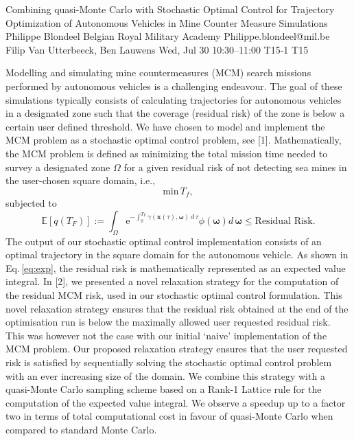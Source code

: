 \begin{talk}
  {Combining quasi-Monte Carlo with Stochastic Optimal Control for Trajectory Optimization of Autonomous Vehicles in Mine Counter Measure Simulations}%
  {Philippe Blondeel}%
  {Belgian Royal Military Academy}%
  {Philippe.blondeel@mil.be}%
  {Filip Van Utterbeeck, Ben Lauwens}%
  {}%
  {Wed, Jul 30 10:30–11:00}%
  {T15-1}%
  {T15}%
  
				
			
Modelling and simulating mine countermeasures (MCM) search missions performed by autonomous vehicles is a challenging endeavour. The goal of these simulations typically consists of calculating trajectories for autonomous vehicles in a designated zone such that the coverage (residual risk) of the zone is below a certain user defined threshold. We have chosen to model and implement the MCM problem as a stochastic optimal control problem, see [1]. Mathematically, the MCM problem is defined as minimizing the total mission time needed to survey a designated zone $\Omega$ for a given residual risk of not detecting sea mines in the  user-chosen square  domain, i.e., 
\begin{equation}
\text{min}\, T_f,
\label{eq:min}
\end{equation}
subjected to
\begin{equation}
 \mathbb{E}[q\left(T_F\right)] :=  \int_\Omega \text{e}^{-\int_0^{T_F} \gamma\left(\bm{x}\left(\tau\right),\bm{\omega}\right)\, d\,\tau}\phi\left(\bm{\omega}\right) d\,\bm{\omega} \leq \text{Residual Risk}.
\label{eq:exp}
\end{equation}
The output of our stochastic optimal control implementation consists of an optimal trajectory in the square domain for the autonomous vehicle.  As shown in Eq.\,\eqref{eq:exp}, the residual risk is mathematically represented as an expected value integral. In [2], we presented a novel relaxation strategy for the computation of the residual MCM risk, used in our stochastic optimal control formulation. This novel relaxation strategy ensures that the  residual risk obtained at the end of the optimisation run is below the maximally allowed user requested residual risk. This was however not the case  with our initial `naive' implementation of the MCM problem. Our proposed relaxation strategy ensures that the user requested risk is satisfied by sequentially solving the stochastic optimal control problem with an ever increasing size of the domain. We combine this strategy with  a quasi-Monte Carlo  sampling scheme based on a Rank-1 Lattice rule for the computation of the expected value integral. We observe a speedup up to a factor two in terms of total computational cost in favour of quasi-Monte Carlo when compared to standard Monte Carlo.



\end{talk}
